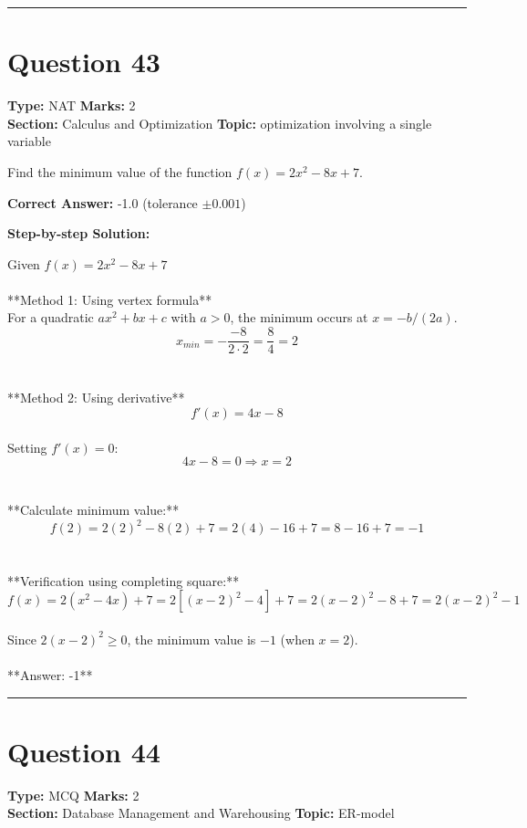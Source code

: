 \documentclass[11pt]{article}
\begin{document}
\vspace{0.8em}
\hrule
\vspace{0.4em}
\section*{Question 43}
\textbf{Type:} NAT \hfill \textbf{Marks:} 2\\
\textbf{Section:} Calculus and Optimization \hfill \textbf{Topic:} optimization involving a single variable

Find the minimum value of the function \(f(x) = 2x^2 - 8x + 7\).



\textbf{Correct Answer:} -1.0 (tolerance \(\pm 0.001\))

\textbf{Step-by-step Solution:}

Given \(f(x) = 2x^2 - 8x + 7\)\\
\\
**Method 1: Using vertex formula**\\
For a quadratic \(ax^2 + bx + c\) with \(a > 0\), the minimum occurs at \(x = -b/(2a)\).\\
\[x_{min} = -\frac{-8}{2 \cdot 2} = \frac{8}{4} = 2\]\\
\\
**Method 2: Using derivative**\\
\[f'(x) = 4x - 8\]\\
Setting \(f'(x) = 0\):\\
\[4x - 8 = 0 \Rightarrow x = 2\]\\
\\
**Calculate minimum value:**\\
\[f(2) = 2(2)^2 - 8(2) + 7 = 2(4) - 16 + 7 = 8 - 16 + 7 = -1\]\\
\\
**Verification using completing square:**\\
\[f(x) = 2(x^2 - 4x) + 7 = 2[(x-2)^2 - 4] + 7 = 2(x-2)^2 - 8 + 7 = 2(x-2)^2 - 1\]\\
Since \(2(x-2)^2 \geq 0\), the minimum value is \(-1\) (when \(x = 2\)).\\
\\
**Answer: -1**

\vspace{0.8em}
\hrule
\vspace{0.4em}
\section*{Question 44}
\textbf{Type:} MCQ \hfill \textbf{Marks:} 2\\
\textbf{Section:} Database Management and Warehousing \hfill \textbf{Topic:} ER-model
\end{document}

